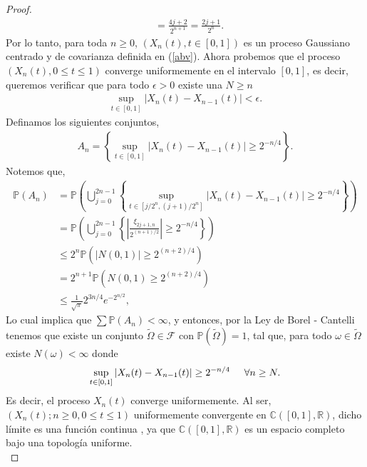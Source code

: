 \begin{proof}
\begin{align*}
	& = \frac{4j + 2}{2^{n+1}} = \frac{2j + 1}{2^n}.
	\end{align*}
Por lo tanto, para toda $n \geq 0$, $(X_n (t), t \in [0, 1])$ es un proceso Gaussiano centrado y de covarianza definida en (\ref{abv}). Ahora probemos que el proceso $(X_n (t), 0 \leq t \leq 1)$ converge uniformemente en el intervalo $[0, 1]$, es decir, queremos verificar que para todo $\epsilon > 0$ existe una $N \geq n$
	\begin{align*}
		\sup_{t \in [0, 1]} |X_n (t) - X_{n-1} (t)| < \epsilon.
	\end{align*}
Definamos los siguientes conjuntos, 
	\begin{align*}
		A_n = \left\{ \sup_{t \in [0, 1]} |X_n (t) - X_{n-1} (t)| \geq 2^{-n / 4} \right\}.
	\end{align*}
Notemos que, 
	\begin{align*}
		\mathbb{P}(A_n) & = \mathbb{P} \left( \bigcup_{j = 0}^{2n - 1} \left\{ \sup_{t \in [j/2^n, (j+1)/2^n]} |X_n (t) - X_{n-1} (t)| \geq 2^{-n / 4} \right\} \right) \\
		& = \mathbb{P} \left( \bigcup_{j = 0}^{2n - 1} \left\{ |\frac{\xi_{2j+1, n}}{2^{(n+1)/2}}| \geq 2^{-n / 4} \right\} \right) \\
		& \leq 2^n \mathbb{P}\left( |N(0, 1)| \geq 2^{(n+2)/4} \right) \\
		& = 2^{n+1} \mathbb{P}\left( N(0, 1) \geq 2^{(n+2)/4} \right) \\
		& \leq \frac{1}{\sqrt{\pi}} 2^{3n/4} e^{-2^{n/2}},
	\end{align*}
Lo cual implica que $\sum \mathbb{P}(A_n) < \infty$, y entonces, por la Ley de Borel - Cantelli tenemos que existe un conjunto $\tilde{\Omega} \in \mathcal{F}$ con $\mathbb{P}(\tilde{\Omega}) = 1$, tal que, para todo $\omega \in \tilde{\Omega}$ existe $N(\omega) < \infty$ donde
	\begin{align*}
		\sup_{t \in [0, 1]} |X_n (t) - X_{n-1} (t)| \geq 2^{-n / 4} \hspace{0.5cm} \forall n \geq N.
	\end{align*}
Es decir, el proceso $X_n (t)$ converge uniformemente. Al ser, $(X_n (t); n \geq 0, 0 \leq t \leq 1)$ uniformemente convergente en $\mathbb{C}([0, 1], \mathbb{R})$, dicho límite es una función continua , ya que $\mathbb{C}([0, 1], \mathbb{R})$ es un espacio completo bajo una topología uniforme. \\


\end{proof}
